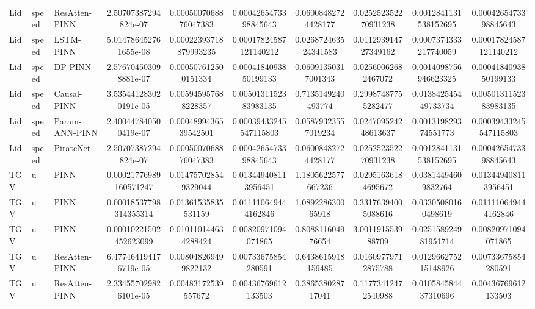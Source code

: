 \begin{landscape}
\begin{longtable}{lllccccccc}
 Lid & speed &  ResAtten-PINN &   2.50707387294824e-07 &  0.0005007068876047383 &  0.0004265473398845643 &  0.06008482724428177 &  0.025252352270931238 & 0.0012841131538152695 &  0.0004265473398845643 \\
 Lid & speed &      LSTM-PINN &  5.014786452761655e-08 & 0.00022393718879993235 & 0.00017824587121140212 & 0.026872463524341583 &  0.011293914727349162 & 0.0007374333217740059 & 0.00017824587121140212 \\
 Lid & speed &        DP-PINN &  2.576704503098881e-07 &   0.000507612500151334 &  0.0004184093850199133 &  0.06091350317001343 &   0.02560062682467072 & 0.0014098756946623325 &  0.0004184093850199133 \\
 Lid & speed &    Causal-PINN &  3.535441283020191e-05 &   0.005945957688228357 &  0.0050131152383983135 &   0.7135149240493774 &   0.29987487755282477 &  0.013842545449733734 &  0.0050131152383983135 \\
 Lid & speed & Param-ANN-PINN &  2.400447840500419e-07 &  0.0004899436539542501 & 0.00039433245547115803 &  0.05879323557019234 &  0.024709524248613637 &  0.001319829374551773 & 0.00039433245547115803 \\
 Lid & speed &      PirateNet &   2.50707387294824e-07 &  0.0005007068876047383 &  0.0004265473398845643 &  0.06008482724428177 &  0.025252352270931238 & 0.0012841131538152695 &  0.0004265473398845643 \\
 TGV &     u &           PINN & 0.00021776989160571247 &   0.014757028549329044 &   0.013449408113956451 &   1.1805622577667236 &   0.02951636184695672 &   0.03814494609832764 &   0.013449408113956451 \\
 TGV &     u &           PINN & 0.00018537798314355314 &    0.01361535835531159 &   0.011110649444162846 &    1.089228630065918 &   0.33176394005088616 &   0.03305080160498619 &   0.011110649444162846 \\
 TGV &     u &           PINN & 0.00010221502452623099 &   0.010110144634288424 &    0.00820971094071865 &    0.808811604976654 &     3.001191553988709 &  0.025158924981951714 &    0.00820971094071865 \\
 TGV &     u &  ResAtten-PINN &  6.477464194176719e-05 &   0.008048269499822132 &    0.00733675854280591 &   0.6438615918159485 &   0.01609779712875788 &  0.012966275215148926 &    0.00733675854280591 \\
 TGV &     u &  ResAtten-PINN &  2.334557029826101e-05 &    0.00483172539557672 &    0.00436769612133503 &    0.386538028717041 &   0.11773412472540988 &  0.010584584437310696 &    0.00436769612133503 \\

\end{longtable}
\end{landscape}
